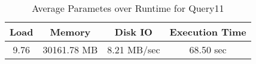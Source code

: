 \documentclass[../../main.tex]{subfiles}
\begin{document}
    \begin{table}
        \begin{center}
            \begin{tabular}{ |c|c|c|c| } 
            \hline
            Load & Memory & Disk IO & Execution Time\\
            \hline
            9.76 & 30161.78 MB & 8.21 MB/sec & 68.50 sec \\
            \hline
            \end{tabular}
            \\[1pt]
            \caption{Average Parametes over Runtime for Query11}
        \end{center}
    \end{table}
    \pagebreak
\end{document}

